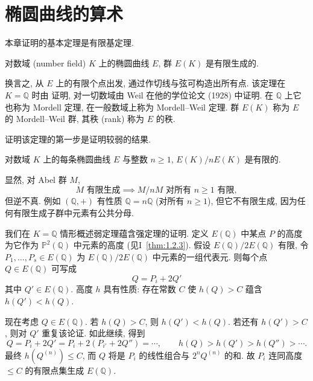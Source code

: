 \chapter{椭圆曲线的算术}\label{ch:4}

本章证明的基本定理是有限基定理.

\begin{theorem}[有限基定理] \label{thm:4.0.1} 
对数域 (number field) $K$ 上的椭圆曲线 $E$, 群 $E(K)$ 是有限生成的.
\end{theorem}

换言之, 从 $E$ 上的有限个点出发, 通过作切线与弦可构造出所有点. 该定理在 $K = \mathbb{Q}$ 时由 \cite{mordell1922} 证明, 对一切数域由 Weil 在他的学位论文 (1928) 中证明. 在 $\mathbb{Q}$ 上它也称为 Mordell 定理, 在一般数域上称为 Mordell--Weil 定理. 群 $E(K)$ 称为 $E$ 的 Mordell--Weil 群, 其秩 (rank) 称为 $E$ 的秩.

证明该定理的第一步是证明较弱的结果.

\begin{theorem}[弱有限基定理] \label{thm:4.0.2} 
对数域 $K$ 上的每条椭圆曲线 $E$ 与整数 $n\ge 1$, $E(K)/nE(K)$ 是有限的.
\end{theorem}

显然, 对 Abel 群 $M$,
\[
M \text{ 有限生成} \implies M/nM \text{ 对所有 } n\ge 1 \text{ 有限},
\]
但逆不真. 例如 $(\mathbb{Q},+)$ 有性质 $\mathbb{Q} = n\mathbb{Q}$ (对所有 $n\ge 1$), 但它不有限生成, 因为任何有限生成子群中元素有公共分母.

我们在 $K = \mathbb{Q}$ 情形概述弱定理蕴含强定理的证明. 定义 $E(\mathbb{Q})$ 中某点 $P$ 的高度为它作为 $\mathbb{P}^2(\mathbb{Q})$ 中元素的高度 (见I~\ref{thm:1.2.3}). 假设 $E(\mathbb{Q})/2E(\mathbb{Q})$ 有限, 令 $P_1, \dots, P_s\in E(\mathbb{Q})$ 为 $E(\mathbb{Q})/2E(\mathbb{Q})$ 中元素的一组代表元. 则每个点 $Q\in E(\mathbb{Q})$ 可写成
\[
Q = P_i + 2Q'
\]
其中 $Q'\in E(\mathbb{Q})$. 高度 $h$ 具有性质: 存在常数 $C$ 使 $h(Q) > C$ 蕴含 $h(Q') < h(Q)$.

现在考虑 $Q\in E(\mathbb{Q})$. 若 $h(Q) > C$, 则 $h(Q') < h(Q)$. 若还有 $h(Q') > C$, 则对 $Q'$ 重复该论证. 如此继续, 得到
\[
Q = P_i + 2Q' = P_i + 2(P_{i'} + 2Q'') = \cdots, \qquad
h(Q) > h(Q') > h(Q'') > \cdots.
\]
最终 $h(Q^{(n)})\le C$, 而 $Q$ 将是 $P_i$ 的线性组合与 $2^nQ^{(n)}$ 的和. 故 $P_i$ 连同高度 $\le C$ 的有限点集生成 $E(\mathbb{Q})$.

